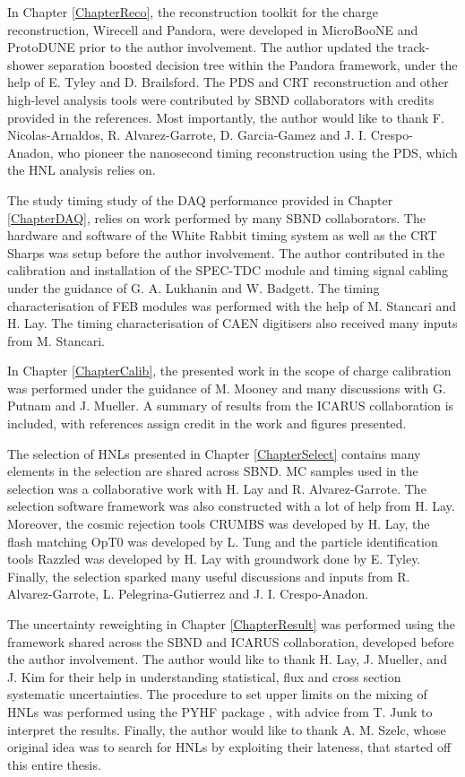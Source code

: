 \begin{declaration}
In Chapter \ref{ChapterReco}, the reconstruction toolkit for the charge reconstruction, Wirecell and Pandora, were developed in MicroBooNE and ProtoDUNE prior to the author involvement.
The author updated the track-shower separation boosted decision tree within the Pandora framework, under the help of E. Tyley and D. Brailsford.
The PDS and CRT reconstruction and other high-level analysis tools were contributed by SBND collaborators with credits provided in the references.
Most importantly, the author would like to thank F. Nicolas-Arnaldos, R. Alvarez-Garrote, D. Garcia-Gamez and J. I. Crespo-Anadon, who pioneer the nanosecond timing reconstruction using the PDS, which the HNL analysis relies on.

The study timing study of the DAQ performance provided in Chapter \ref{ChapterDAQ}, relies on work performed by many SBND collaborators.
The hardware and software of the White Rabbit timing system as well as the CRT Sharps was setup before the author involvement.
The author contributed in the calibration and installation of the SPEC-TDC module and timing signal cabling under the guidance of G. A. Lukhanin and W. Badgett.
The timing characterisation of FEB modules was performed with the help of M. Stancari and H. Lay.
The timing characterisation of CAEN digitisers also received many inputs from M. Stancari.  

In Chapter \ref{ChapterCalib}, the presented work in the scope of charge calibration was performed under the guidance of M. Mooney and many discussions with G. Putnam and J. Mueller.
A summary of results from the ICARUS collaboration is included, with references assign credit in the work and figures presented.

The selection of HNLs presented in Chapter \ref{ChapterSelect} contains many elements in the selection are shared across SBND.
MC samples used in the selection was a collaborative work with H. Lay and R. Alvarez-Garrote.
The selection software framework was also constructed with a lot of help from H. Lay. 
Moreover, the cosmic rejection tools CRUMBS was developed by H. Lay, the flash matching OpT0 was developed by L. Tung and the particle identification tools Razzled was developed by H. Lay with groundwork done by E. Tyley.
Finally, the selection sparked many useful discussions and inputs from R. Alvarez-Garrote, L. Pelegrina-Gutierrez and J. I. Crespo-Anadon.

The uncertainty reweighting in Chapter \ref{ChapterResult} was performed using the framework shared across the SBND and ICARUS collaboration, developed before the author involvement.
The author would like to thank H. Lay, J. Mueller, and J. Kim for their help in understanding statistical, flux and cross section systematic uncertainties.
The procedure to set upper limits on the mixing of HNLs was performed using the PYHF package \cite{pyhf}, with advice from T. Junk to interpret the results.
Finally, the author would like to thank A. M. Szelc, whose original idea was to search for HNLs by exploiting their lateness, that started off this entire thesis.  


\end{declaration}

